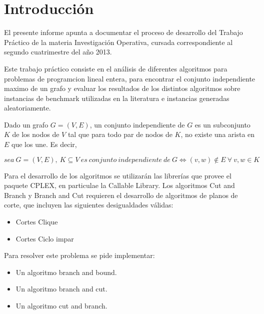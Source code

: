 \section{Introducción}
\par{El presente informe apunta a documentar el proceso de desarrollo del Trabajo
Práctico de la materia Investigaci\'on Operativa, cursada
correspondiente al segundo cuatrimestre del año 2013.}\\

\par{Este trabajo práctico consiste en el análisis de diferentes algoritmos
para problemas de programcion lineal entera, para encontrar el conjunto independiente maximo de
un grafo y evaluar los resultados de los distintos algoritmos sobre instancias de benchmark utilizadas en la literatura e instancias generadas aleatoriamente.

 Dado un grafo $G=(V,E)$, un conjunto independiente de $G$ es un subconjunto $K$
de los nodos de $V$ tal que para todo par de nodos de $K$, no existe una arista
en $E$ que los une. Es decir,}
\[
sea\ G = (V,E),\ K \subseteq V\ es\ conjunto\ independiente\ de\ G \Leftrightarrow (v,w)
\notin E\ \forall\ v,w \in K
\]

Para el desarrollo de los algoritmos se utilizar\'an las librer\'ias que provee el paquete CPLEX,
en particulae la Callable Library.
Los algoritmos Cut and Branch y Branch and Cut requieren el desarrollo de algoritmos de
planos de corte, que incluyen las siguientes desigualdades v\'alidas:

\begin{itemize}
\item Cortes Clique
\item Cortes Ciclo impar
\end{itemize}



\par{Para resolver este problema se pide implementar:}
\begin{itemize}
\item Un algoritmo branch and bound.
\item Un algoritmo branch and cut.
\item Un algoritmo cut and branch.
\end{itemize} 

